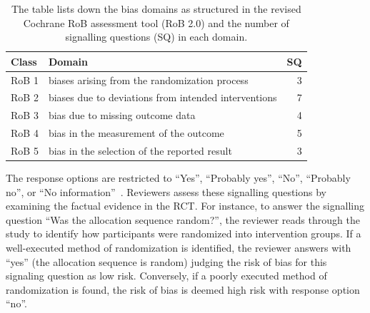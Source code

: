 \documentclass[sn-mathphys,Numbered]{sn-jnl}%
\theoremstyle{thmstyleone}%
\theoremstyle{thmstyletwo}%
\theoremstyle{thmstylethree}%
\begin{document}
%
%
%
\begin{table}
 \centering
   \caption{The table lists down the bias domains as structured in the revised Cochrane RoB assessment tool (RoB 2.0) and the number of signalling questions (SQ) in each domain.}\label{tab1}
    \begin{tabular}{|l|l|r|}
    \hline
     Class & Domain & SQ\\
    \hline
    \hline
    RoB 1 & biases arising from the randomization process &  3\\
    RoB 2 & biases due to deviations from intended interventions & 7\\
    RoB 3 & bias due to missing outcome data & 4\\
    RoB 4 & bias in the measurement of the outcome & 5\\
    RoB 5 & bias in the selection of the reported result & 3\\
    \hline
    \end{tabular}
\end{table}
%
%
%


The response options are restricted to ``Yes'', ``Probably yes'', ``No'', ``Probably no'', or ``No information''~\cite{sterne2019rob}.
Reviewers assess these signalling questions by examining the factual evidence in the RCT.
For instance, to answer the signalling question ``Was the allocation sequence random?'', the reviewer reads through the study to identify how participants were randomized into intervention groups.
If a well-executed method of randomization is identified, the reviewer answers with ``yes'' (the allocation sequence is random) judging the risk of bias for this signaling question as low risk.
Conversely, if a poorly executed method of randomization is found, the risk of bias is deemed  high risk with response option ``no''.
\end{document}
